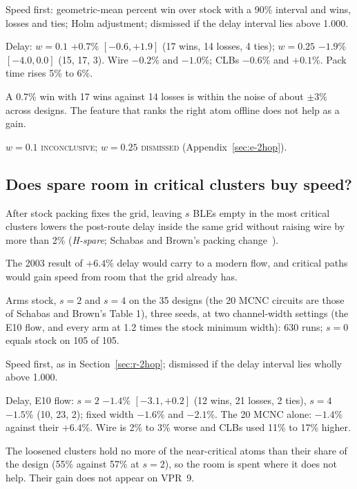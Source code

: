  Speed first: geometric-mean percent win over stock with a 90\% interval and wins, losses and ties; Holm adjustment; dismissed if the delay interval lies above 1.000.

 Delay: $w=0.1$ $+0.7$\% $[-0.6,+1.9]$ (17 wins, 14 losses, 4 ties); $w=0.25$ $-1.9$\% $[-4.0,0.0]$ (15, 17, 3). Wire $-0.2$\% and $-1.0$\%; CLBs $-0.6$\% and $+0.1$\%. Pack time rises 5\% to 6\%.

 A 0.7\% win with 17 wins against 14 losses is within the noise of about $\pm3\%$ across designs. The feature that ranks the right atom offline does not help as a gain.

 $w=0.1$ \textsc{inconclusive}; $w=0.25$ \textsc{dismissed} (Appendix~\ref{sec:e-2hop}).

\subsection{Does spare room in critical clusters buy speed?}
\label{sec:r-spare}

 After stock packing fixes the grid, leaving $s$ BLEs empty in the most critical clusters lowers the post-route delay inside the same grid without raising wire by more than 2\% (\emph{H-spare}; Schabas and Brown's packing change~\cite{schabas2003duplication}).

 The 2003 result of $+6.4$\% delay would carry to a modern flow, and critical paths would gain speed from room that the grid already has.

 Arms stock, $s=2$ and $s=4$ on the 35 designs (the 20 MCNC circuits are those of Schabas and Brown's Table 1), three seeds, at two channel-width settings (the E10 flow, and every arm at 1.2 times the stock minimum width): 630 runs; $s=0$ equals stock on 105 of 105.

 Speed first, as in Section~\ref{sec:r-2hop}; dismissed if the delay interval lies wholly above 1.000.

 Delay, E10 flow: $s=2$ $-1.4$\% $[-3.1,+0.2]$ (12 wins, 21 losses, 2 ties), $s=4$ $-1.5$\% (10, 23, 2); fixed width $-1.6$\% and $-2.1$\%. The 20 MCNC alone: $-1.4$\% against their $+6.4$\%. Wire is 2\% to 3\% worse and CLBs used 11\% to 17\% higher.

 The loosened clusters hold no more of the near-critical atoms than their share of the design (55\% against 57\% at $s=2$), so the room is spent where it does not help. Their gain does not appear on VPR~9.

